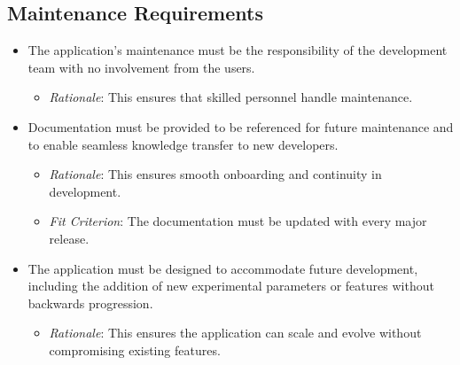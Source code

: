 \documentclass[12pt]{article}
\begin{document}
\subsection{Maintenance Requirements}
\begin{itemize}
    \item The application’s maintenance must be the responsibility of the
    development team with no involvement from the users.
    \begin{itemize}
        \item \textit{Rationale}: This ensures that skilled personnel handle
        maintenance.
    \end{itemize}
    
    \item Documentation must be provided to be referenced for future maintenance
    and to enable seamless knowledge transfer to new developers.
    \begin{itemize}
        \item \textit{Rationale}: This ensures smooth onboarding and continuity
        in development.
        \item \textit{Fit Criterion}: The documentation must be updated with
        every major release.
    \end{itemize}
    
    \item The application must be designed to accommodate future development,
    including the addition of new experimental parameters or features without
    backwards progression.
    \begin{itemize}
        \item \textit{Rationale}: This ensures the application can scale and
        evolve without compromising existing features.
    \end{itemize}
\end{itemize}
\end{document}
